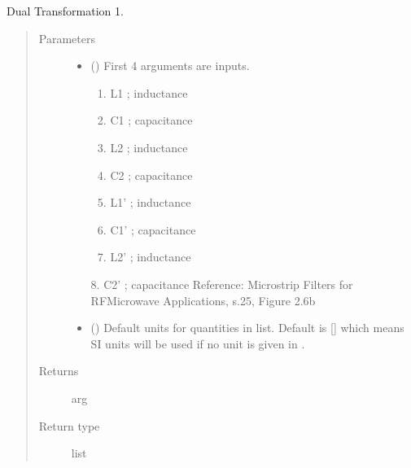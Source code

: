 \documentclass[letterpaper,10pt,english]{sphinxmanual}
\begin{document}

\begin{fulllineitems}
\label{\detokenize{components:components.DualTransformation2}}
Dual Transformation 1.
\begin{quote}\begin{description}
\item[{Parameters}] \leavevmode\begin{itemize}
\item {} 
 () \textendash{} 
First 4 arguments are inputs.
\begin{enumerate}
%
\item {} 
L1 ; inductance

\item {} 
C1 ; capacitance

\item {} 
L2 ; inductance

\item {} 
C2 ; capacitance

\item {} 
L1’ ; inductance

\item {} 
C1’ ; capacitance

\item {} 
L2’ ; inductance

\end{enumerate}

8.  C2’ ; capacitance
Reference:  Microstrip Filters for RF\sphinxhyphen{}Microwave Applications, s.25, Figure 2.6b


\item {} 
 (\sphinxstyleliteralemphasis{\sphinxupquote{, }}) \textendash{} Default units for quantities in  list. Default is {[}{]} which means SI units will be used if no unit is given in .

\end{itemize}

\item[{Returns}] \leavevmode
arg

\item[{Return type}] \leavevmode
list

\end{description}\end{quote}

\end{fulllineitems}
\end{document}
